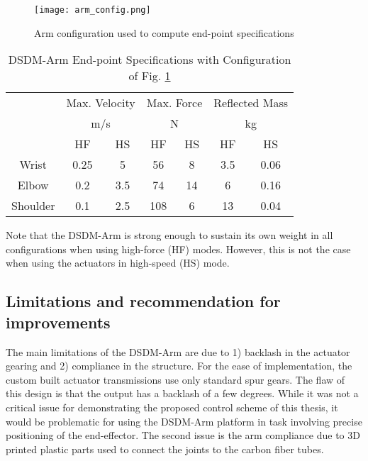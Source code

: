 \begin{figure}[htb]
	\centering
		\texttt{[image: arm\_config.png]}
	\caption{Arm configuration used to compute end-point specifications}
	\label{fig:arm_config}
\end{figure}

\begin{table}[htpb]
	\centering
	\caption[DSDM-Arm End-point Specifications]{DSDM-Arm End-point Specifications with Configuration of Fig. \ref{fig:arm_config}}
		\begin{tabular}{ c c c c c c c }
			\hline
			   & \multicolumn{2}{c}{Max. Velocity} & \multicolumn{2}{c}{Max. Force} & \multicolumn{2}{c}{Reflected Mass}\\
			   & \multicolumn{2}{c}{m/s} & \multicolumn{2}{c}{N} & \multicolumn{2}{c}{kg } \\
				\hline
			  & HF & HS & HF & HS & HF & HS \\
			\hline
			 Wrist    & 0.25 & 5    & 56  &  8  & 3.5 & 0.06   \\
			 Elbow    & 0.2  & 3.5  & 74  &  14 & 6   & 0.16    \\
			 Shoulder & 0.1  & 2.5  & 108 &  6  & 13  & 0.04    \\
			\hline
		\end{tabular}
	\label{tab:robotspec2}
\end{table}

Note that the DSDM-Arm is strong enough to sustain its own weight in all configurations when using high-force (HF) modes. However, this is not the case when using the actuators in high-speed (HS) mode. 


\subsection{Limitations and recommendation for improvements} 

The main limitations of the DSDM-Arm are due to 1) backlash in the actuator gearing and 2) compliance in the structure. For the ease of implementation, the custom built actuator transmissions use only standard spur gears. The flaw of this design is that the output has a backlash of a few degrees. While it was not a critical issue for demonstrating the proposed control scheme of this thesis, it would be problematic for using the DSDM-Arm platform in task involving precise positioning of the end-effector. The second issue is the arm compliance due to 3D printed plastic parts used to connect the joints to the carbon fiber tubes. 

